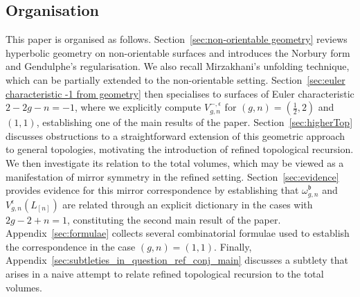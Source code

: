 \documentclass[12pt]{amsart}
\theoremstyle{plain}
\theoremstyle{definition}
\theoremstyle{remark}
\numberwithin{equation}{section}
\begin{document}


\subsection*{Organisation}


This paper is organised as follows. Section~\ref{sec:non-orientable geometry} reviews hyperbolic geometry on non-orientable surfaces and introduces the Norbury form and Gendulphe's regularisation. We also recall Mirzakhani's unfolding technique, which can be partially extended to the non-orientable setting. Section~\ref{sec:euler characteristic -1 from geometry} then specialises to surfaces of Euler characteristic $2-2g-n=-1$, where we explicitly compute $V_{g,n}^{-,\epsilon}$ for $(g,n)=(\frac12,2)$ and $(1,1)$, establishing one of the main results of the paper.
Section~\ref{sec:higherTop} discusses obstructions to a straightforward extension of this geometric approach to general topologies, motivating the introduction of refined topological recursion. We then investigate its relation to the total volumes, which may be viewed as a manifestation of mirror symmetry in the refined setting. Section~\ref{sec:evidence} provides evidence for this mirror correspondence by establishing that $\omega_{g,n}^{\mathfrak b}$ and $V_{g,n}^{\epsilon}(L_{[n]})$ are related through an explicit dictionary in the cases with $2g-2+n=1$, constituting the second main result of the paper. Appendix~\ref{sec:formulae} collects several combinatorial formulae used to establish the correspondence in the case $(g,n)=(1,1)$. Finally, Appendix~\ref{sec:subtleties_in_question_ref_conj_main} discusses a subtlety that arises in a naive attempt to relate refined topological recursion to the total volumes.
\end{document}
